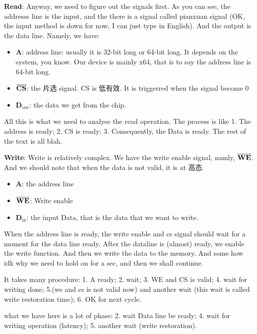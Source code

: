 \documentclass[11pt]{article}
\begin{document}
\textbf{Read}: Anyway, we need to figure out the signals first. As you can see, the addresss line is the input, and the there is a signal called pianxuan signal (OK, the input method is down for now, I can just type in English). And the output is the data line. Namely, we have: 

\begin{itemize}
\item \textbf{A}: address line: usually it is 32-bit long or 64-bit long. It depends on the system, you know. Our device is mainly x64, that is to say the address line is 64-bit long.
\item \(\bf\overline{CS}\): the 片选 signal. CS is 低有效. It is triggerred when the signal become 0
\item \textbf{D\(_{\text{out}}\)}: the data we get from the chip.
\end{itemize}

All this is what we need to analyse the read operation. The process is like 1. The address is ready; 2. CS is ready; 3. Consequently, the Data is ready. The rest of  the text is all blah.

\textbf{Write}:  Write is relatively complex. We have the write enable signal, namly, \(\bf \overline{WE}\). And we should note that when the data is not valid, it is at 高态. 

\begin{itemize}
\item \textbf{A}: the address line
\item \(\bf \overline{WE}\): Write enable
\item \textbf{D\(_{\text{in}}\)}: the input Data, that is the data that we want to write.
\end{itemize}

When the address line is ready, the write enable and cs signal should wait for a moment for the data line ready. After the dataline is (almost) ready, we enable the write function. And then we write the data to the memory. And some how idk why we need to hold on for a sec, and then we shall continue. 

It takes many procedure: 1. A ready; 2. wait; 3. WE and CS is valid; 4. wait for writing done; 5.(we and cs is not valid now) and another wait (this wait is called write restoration time); 6. OK for next cycle. 

what we have here is a lot of phase: 2. wait Data line be ready; 4. wait for writing operation (latency); 5. another wait (write restoration). 
\end{document}
